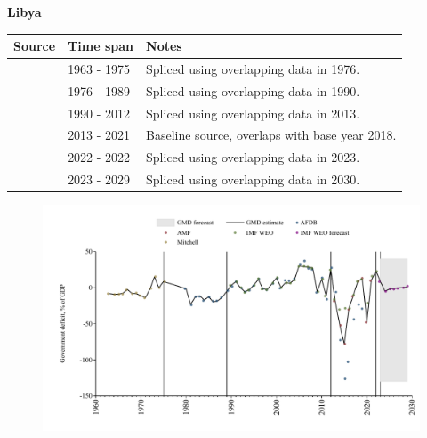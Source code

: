 \documentclass[12pt,a4paper,landscape]{article}
\begin{document}
\begin{adjustbox}{max totalsize={\paperwidth}{\paperheight},center}
\begin{minipage}[t][\textheight][t]{\textwidth}
\vspace*{0.5cm}
{}
\begin{center}
{\Large\bfseries Libya}
\end{center}
\vspace{0.5cm}
\begin{table}[H]
\centering
\small
\begin{tabular}{|l|l|l|}
\hline
\textbf{Source} & \textbf{Time span} & \textbf{Notes} \\
\hline
\rowcolor{white}\cite{Mitchell}& 1963 - 1975 &Spliced using overlapping data in 1976.\\
\rowcolor{lightgray}\cite{AFDB}& 1976 - 1989 &Spliced using overlapping data in 1990.\\
\rowcolor{white}\cite{IMF_WEO}& 1990 - 2012 &Spliced using overlapping data in 2013.\\
\rowcolor{lightgray}\cite{AMF}& 2013 - 2021 &Baseline source, overlaps with base year 2018.\\
\rowcolor{white}\cite{IMF_WEO}& 2022 - 2022 &Spliced using overlapping data in 2023.\\
\rowcolor{lightgray}\cite{IMF_WEO_forecast}& 2023 - 2029 &Spliced using overlapping data in 2030.\\
\hline
\end{tabular}
\end{table}
\begin{figure}[H]
\centering
\includegraphics[width=\textwidth,height=0.6\textheight,keepaspectratio]{graphs/LBY_govdef_GDP.pdf}
\end{figure}
\end{minipage}
\end{adjustbox}
\end{document}
